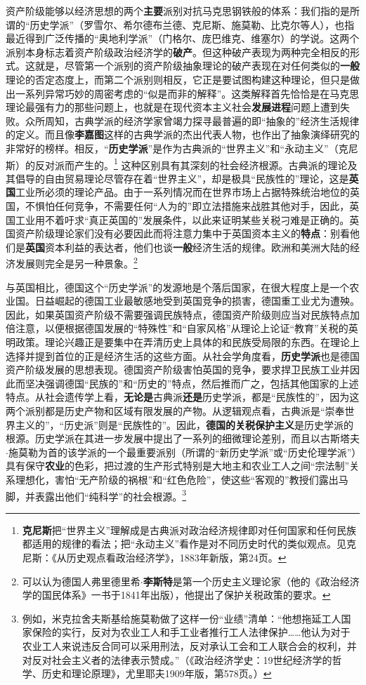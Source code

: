 \documentclass[fontset=fandol, a4paper, 12pt, openright]{ctexbook}
\begin{document}
资产阶级能够以经济思想的两个\textbf{主要}派别对抗马克思钢铁般的体系：我们指的是所谓的“历史学派”（罗雪尔、希尔德布兰德、克尼斯、施莫勒、比克尔等人），也指最近得到广泛传播的“奥地利学派”（门格尔、庞巴维克、维塞尔）的学说。这两个派别本身标志着资产阶级政治经济学的\textbf{破产}。但这种破产表现为两种完全相反的形式。这就是，尽管第一个派别的资产阶级抽象理论的破产表现在对任何类似的\textbf{一般}理论的否定态度上，而第二个派别则相反，它正是要试图构建这种理论，但只是做出一系列异常巧妙的周密考虑的“似是而非的解释”。这类解释首先恰恰是在马克思理论最强有力的那些问题上，也就是在现代资本主义社会\textbf{发展进程}问题上遭到失败。众所周知，古典学派的经济学家曾竭力探寻最普遍的即“抽象的”经济生活规律的定义。而且像\textbf{李嘉图}这样的古典学派的杰出代表人物，也作出了抽象演绎研究的非常好的榜样。相反，“\textbf{历史学派}”是作为古典派的“世界主义”和“永动主义”（克尼斯）的反对派而产生的。\footnote{\textbf{克尼斯}把“世界主义”理解成是古典派对政治经济规律即对任何国家和任何民族都适用的规律的看法；把“永动主义”看作是对不同历史时代的类似观点。见克尼斯：《从历史观点看政治经济学》，1883年新版，第24页。} 这种区别具有其深刻的社会经济根源。古典派的理论及其倡导的自由贸易理论尽管存在着“世界主义”，却是极具“民族性的”理论，这是\textbf{英国}工业所必须的理论产品。由于一系列情况而在世界市场上占据特殊统治地位的英国，不惧怕任何竞争，不需要任何“人为的”即立法措施来战胜其他对手，因此，英国工业用不着吁求“真正英国的”发展条件，以此来证明某些关税刁难是正确的。英国资产阶级理论家们没有必要因此而将注意力集中于英国资本主义的\textbf{特点}：别看他们是\textbf{英国}资本利益的表达者，他们也谈\textbf{一般}经济生活的规律。欧洲和美洲大陆的经济发展则完全是另一种景象。\footnote{可以认为德国人弗里德里希$\cdot$\textbf{李斯特}是第一个历史主义理论家（他的《政治经济学的国民体系》一书于1841年出版），他提出了保护关税政策的要求。}

与英国相比，德国这个“历史学派”的发源地是个落后国家，在很大程度上是一个农业国。日益崛起的德国工业最敏感地受到英国竞争的损害，德国重工业尤为遭殃。因此，如果英国资产阶级不需要强调民族特点，德国资产阶级则应当对民族特点加倍注意，以便根据德国发展的“特殊性”和“自家风格”从理论上论证“教育”关税的英明政策。理论兴趣正是要集中在弄清历史上具体的和民族受局限的东西。在理论上选择并提到首位的正是经济生活的这些方面。从社会学角度看，\textbf{历史学派}也是德国资产阶级发展的思想表现。德国资产阶级害怕英国的竞争，要求捍卫民族工业并因此而坚决强调德国“民族的”和“历史的”特点，然后推而广之，包括其他国家的上述特点。从社会遗传学上看，\textbf{无论是}古典派\textbf{还是}历史学派，都是“民族性的”，因为这两个派别都是历史产物和区域有限发展的产物。从逻辑观点看，古典派是“崇奉世界主义的”，“历史派”则是“民族性的”。因此，\textbf{德国的关税保护主义}是历史学派的根源。历史学派在其进一步发展中提出了一系列的细微理论差别，而且以古斯塔夫$\cdot$施莫勒为首的该学派的一个最重要派别（所谓的“新历史学派”或“历史伦理学派”）具有保守\textbf{农业}的色彩，把过渡的生产形式特别是大地主和农业工人之间“宗法制”关系理想化，害怕“无产阶级的祸根”和“红色危险”，使这些“客观的”教授们露出马脚，并表露出他们“纯科学”的社会根源。\footnote{例如，米克拉舍夫斯基给施莫勒做了这样一份“业绩”清单：“他想拖延工人国家保险的实行，反对为农业工人和手工业者推行工人法律保护……他认为对于农业工人来说违反合同可以采用刑法，反对承认工会和工人联合会的权利，并对反对社会主义者的法律表示赞成。”（《政治经济学史：19世纪经济学的哲学、历史和理论原理》，尤里耶夫1909年版，第578页。）}
\end{document}
